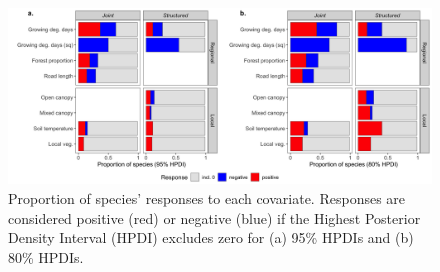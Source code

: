 \documentclass[preprint,review,times,12pt,3p]{elsarticle}
\begin{document}
\begin{figure}
	\centering\includegraphics[width=6.5in]{../../../ms/1_Ecography/1/figs/b_opt_bar.png}
	\caption{\label{fig:b_bars} Proportion of species' responses to each covariate. Responses are considered positive (red) or negative (blue) if the Highest Posterior Density Interval (HPDI) excludes zero for (a) 95\% HPDIs and (b) 80\% HPDIs. }
\end{figure}
\end{document}
